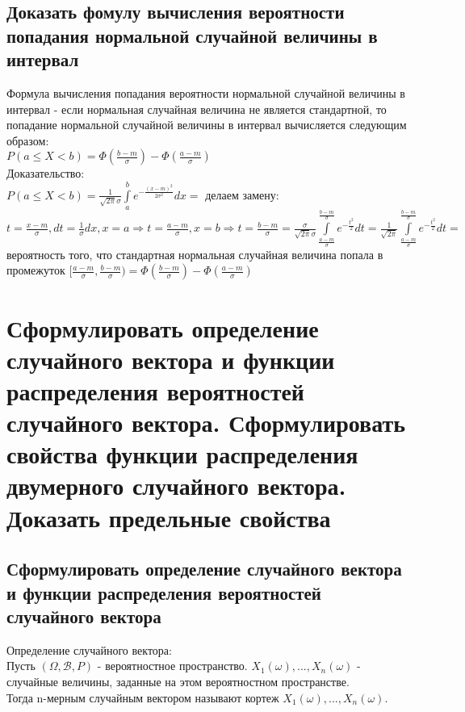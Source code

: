 \subsection{Доказать фомулу вычисления вероятности попадания нормальной случайной величины в интервал}
Формула вычисления попадания вероятности нормальной случайной величины в интервал - если нормальная случайная величина не является стандартной, то попадание нормальной случайной величины в интервал вычисляется следующим образом:\\
$P(a \leqslant X < b) = \Phi(\frac{b - m}{\sigma}) - \Phi(\frac{a - m}{\sigma})$\\

Доказательство:\\
$P(a \leqslant X < b) = \frac{1}{\sqrt{2\pi} \sigma} \int\limits_{a}^{b} e^{-\frac{(x - m)^2}{2 \sigma^2}} dx = $ делаем замену: $t  = \frac{x -m}{\sigma}, dt = \frac{1}{\sigma} dx, x = a \Rightarrow t = \frac{a - m}{\sigma}, x = b \Rightarrow t = \frac{b - m}{\sigma} = \frac{\sigma}{\sqrt{2 \pi} \sigma} \int\limits^{\frac{b - m}{\sigma}}_{\frac{a - m}{\sigma}} e^{-\frac{t^{2}}{2}} dt = \frac{1}{\sqrt{2 \pi}} \int\limits^{\frac{b - m}{\sigma}}_{\frac{a - m}{\sigma}} e^{-\frac{t^{2}}{2}} dt = $ вероятность того, что стандартная нормальная случайная величина попала в промежуток $[\frac{a - m}{\sigma}, \frac{b  - m}{\sigma}) = \Phi(\frac{b - m}{\sigma}) - \Phi(\frac{a - m}{\sigma})$\\

\section{Сформулировать определение случайного вектора и функции распределения вероятностей случайного вектора. Сформулировать свойства функции распределения двумерного случайного вектора. Доказать предельные свойства}

\subsection{Сформулировать определение случайного вектора и функции распределения вероятностей случайного вектора}

Определение случайного вектора:\\
Пусть $(\Omega, \mathcal{B}, P)$ - вероятностное пространство. $X_{1}(\omega), ... , X_{n}(\omega)$ - случайные величины, заданные на этом вероятностном пространстве.\\
Тогда n-мерным случайным вектором называют кортеж $X_{1}(\omega), ... , X_{n}(\omega)$.\\

